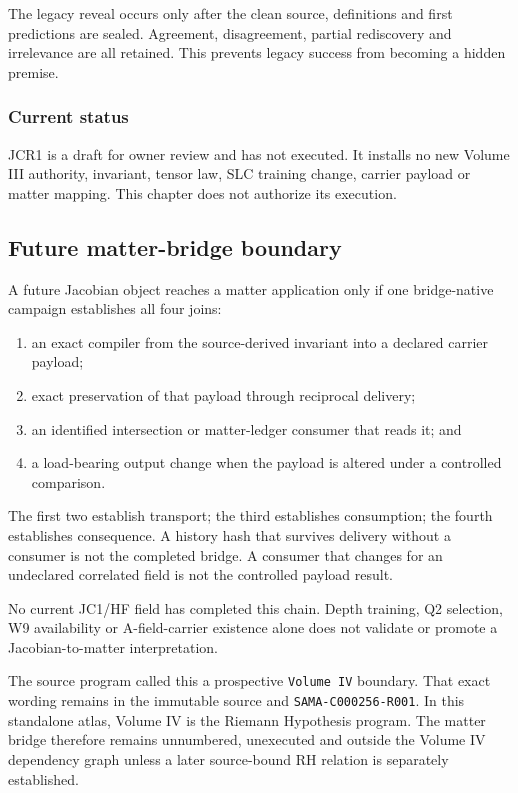 The legacy reveal occurs only after the clean source, definitions and
first predictions are sealed. Agreement, disagreement, partial
rediscovery and irrelevance are all retained. This prevents legacy
success from becoming a hidden premise.

\subsubsection{Current status}\label{viii-ch11-current-status}

JCR1 is a draft for owner review and has not executed. It installs no
new Volume III authority, invariant, tensor law, SLC training change,
carrier payload or matter mapping. This chapter does not authorize its
execution.

\subsection{Future matter-bridge
boundary}\label{viii-ch11-future-matter-bridge-boundary}

A future Jacobian object reaches a matter application only if one
bridge-native campaign establishes all four joins:

\begin{enumerate}
\def\labelenumi{\arabic{enumi}.}
\tightlist
\item
  an exact compiler from the source-derived invariant into a declared
  carrier payload;
\item
  exact preservation of that payload through reciprocal delivery;
\item
  an identified intersection or matter-ledger consumer that reads it;
  and
\item
  a load-bearing output change when the payload is altered under a
  controlled comparison.
\end{enumerate}

The first two establish transport; the third establishes consumption;
the fourth establishes consequence. A history hash that survives
delivery without a consumer is not the completed bridge. A consumer that
changes for an undeclared correlated field is not the controlled payload
result.

No current JC1/HF field has completed this chain. Depth training, Q2
selection, W9 availability or A-field-carrier existence alone does not
validate or promote a Jacobian-to-matter interpretation.

The source program called this a prospective \texttt{Volume\ IV}
boundary. That exact wording remains in the immutable source and
\texttt{SAMA-C000256-R001}. In this standalone atlas, Volume IV is the
Riemann Hypothesis program. The matter bridge therefore remains
unnumbered, unexecuted and outside the Volume IV dependency graph unless
a later source-bound RH relation is separately established.

